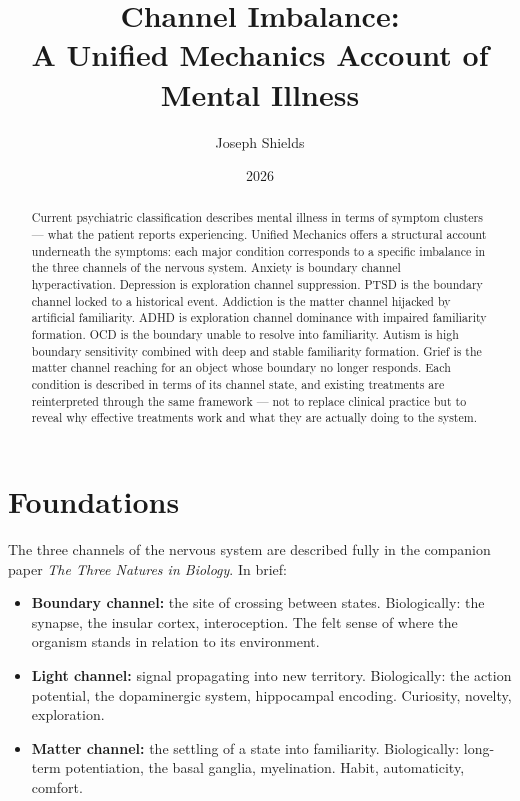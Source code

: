 \documentclass[12pt]{article}
\title{\textbf{Channel Imbalance:\\
A Unified Mechanics Account of Mental Illness}}
\author{Joseph Shields}
\date{2026}
\begin{document}
\maketitle

\begin{abstract}
Current psychiatric classification describes mental illness in terms of
symptom clusters --- what the patient reports experiencing. Unified Mechanics
offers a structural account underneath the symptoms: each major condition
corresponds to a specific imbalance in the three channels of the nervous system.
Anxiety is boundary channel hyperactivation. Depression is exploration channel
suppression. PTSD is the boundary channel locked to a historical event. Addiction
is the matter channel hijacked by artificial familiarity. ADHD is exploration
channel dominance with impaired familiarity formation. OCD is the boundary unable
to resolve into familiarity. Autism is high boundary sensitivity combined with
deep and stable familiarity formation. Grief is the matter channel reaching for
an object whose boundary no longer responds. Each condition is described in terms
of its channel state, and existing treatments are reinterpreted through the same
framework --- not to replace clinical practice but to reveal why effective
treatments work and what they are actually doing to the system.
\end{abstract}

\section{Foundations}

The three channels of the nervous system are described fully in the companion
paper \textit{The Three Natures in Biology}. In brief:

\begin{itemize}
  \item \textbf{Boundary channel:} the site of crossing between states.
        Biologically: the synapse, the insular cortex, interoception. The felt
        sense of where the organism stands in relation to its environment.
  \item \textbf{Light channel:} signal propagating into new territory. Biologically:
        the action potential, the dopaminergic system, hippocampal encoding.
        Curiosity, novelty, exploration.
  \item \textbf{Matter channel:} the settling of a state into familiarity.
        Biologically: long-term potentiation, the basal ganglia, myelination.
        Habit, automaticity, comfort.
\end{itemize}
\end{document}
